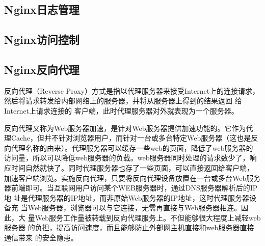 \subsection{Nginx日志管理}

\subsection{Nginx访问控制}

\subsection{Nginx反向代理}
\label{subsec:NginxReverseProxy}

反向代理（Reverse Proxy）方式是指以代理服务器来接受Internet上的连接请求，
然后将请求转发给内部网络上的服务器，并将从服务器上得到的结果返回
给Internet上请求连接的 客户端，此时代理服务器对外就表现为一个服务器。

反向代理又称为Web服务器加速，是针对Web服务器提供加速功能的。它作为代
理Cache，但并不针对浏览器用户，而针对一台或多台特定Web服务器（这也是反
向代理名称的由来）。代理服务器可以缓存一些web的页面，降低了web服务器的
访问量，所以可以降低web服务器的负载。web服务器同时处理的请求数少了，响
应时间自然就快了。同时代理服务器也存了一些页面，可以直接返回给客户端，
加速客户端浏览。实施反向代理，只要将反向代理设备放置在一台或多台Web服务
器前端即可。当互联网用户访问某个WEB服务器时，通过DNS服务器解析后的IP地
址是代理服务器的IP地址，而非原始Web服务器的IP地址，这时代理服务器设备充
当Web服务器，浏览器可以与它连接，无需再直接与Web服务器相连。因此，大
量Web服务工作量被转载到反向代理服务上。不但能够很大程度上减轻web服务器
的负担，提高访问速度，而且能够防止外部网主机直接和web服务器直接通信带来
的安全隐患。

